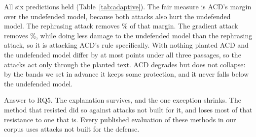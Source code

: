 All six predictions held (Table~\ref{tab:adaptive}). The fair measure is
ACD's margin over the undefended model, because both attacks also hurt the
undefended model. The rephrasing attack removes \PctAcdRemovedBestOf\% of
that margin. The gradient attack removes \PctAcdRemovedGradient\%, while doing
less damage to the undefended model than the rephrasing attack, so it is
attacking ACD's rule specifically. With nothing planted ACD and the
undefended model differ by at most \NAcdGapCleanMax{} points under all three
passages, so the attacks act only through the planted text. ACD
degrades but does not collapse: by the bands we set in advance it keeps some
protection, and it never falls below the undefended model.

Answer to RQ5. The explanation survives, and the one exception shrinks. The
method that resisted did so against attacks not built for it, and loses most
of that resistance to one that is. Every published evaluation of these methods
in our corpus uses attacks not built for the defense.
